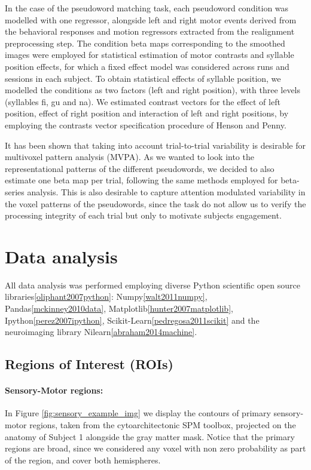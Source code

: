 In the case of the pseudoword matching task, each pseudoword condition was modelled with one regressor, alongside left and right motor events derived from the behavioral responses and motion regressors extracted from the realignment preprocessing step.
The condition beta maps corresponding to the smoothed images were employed for statistical estimation of motor contrasts and syllable position effects, for which a fixed effect model was considered across runs and sessions in each subject.
To obtain statistical effects of syllable position, we modelled the conditions as two factors (left and right position), with three levels (syllables fi, gu and na).
We estimated contrast vectors for the effect of left position, effect of right position and interaction of left and right positions, by employing the contrasts vector specification procedure of Henson and Penny\citep{henson2003anovas}.

It has been shown that taking into account trial-to-trial variability is desirable for multivoxel pattern analysis (MVPA)\citep{abdulrahman2016effect, mumford2012deconvolving}.
As we wanted to look into the representational patterns of the different pseudowords, we decided to also estimate one beta map per trial, following the same methods employed for beta-series analysis\citep{cisler2014comparison}.
This is also desirable to capture attention modulated variability in the voxel patterns of the pseudowords, since the task do not allow us to verify the processing integrity of each trial but only to motivate subjects engagement.


\section{Data analysis}

All data analysis was performed employing diverse Python scientific open source libraries\ref{oliphant2007python}: Numpy\ref{walt2011numpy}, Pandas\ref{mckinney2010data}, Matplotlib\ref{hunter2007matplotlib}, Ipython\ref{perez2007ipython}, Scikit-Learn\ref{pedregosa2011scikit} and the neuroimaging library Nilearn\ref{abraham2014machine}.

\subsection{Regions of Interest (ROIs)}

\paragraph{Sensory-Motor regions:}
In Figure \ref{fig:sensory_example_img} we display the contours of primary sensory-motor regions, taken from the cytoarchitectonic SPM toolbox\citep{eickhoff2005new}, projected on the anatomy of Subject 1 alongside the gray matter mask.
Notice that the primary regions are broad, since we considered any voxel with non zero probability as part of the region, and cover both hemispheres.


